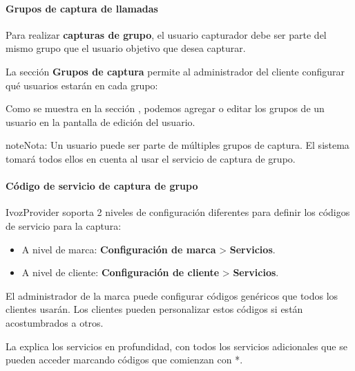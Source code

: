 \documentclass[letterpaper,10pt,spanish]{sphinxmanual}
\begin{document}
\paragraph{Grupos de captura de llamadas}
\label{administration_portal/client/vpbx/user_configuration/pick_up_groups:call-pickup-groups}
Para realizar \textbf{capturas de grupo}, el usuario capturador debe ser parte del mismo grupo que el usuario objetivo que desea capturar.

La sección \textbf{Grupos de captura} permite al administrador del cliente configurar qué usuarios estarán en cada grupo:

Como se muestra en la sección {\hyperref[administration_portal/client/vpbx/users:users]{}}, podemos agregar o editar los grupos de un usuario en la pantalla de edición del usuario.

\begin{notice}{note}{Nota:}
Un usuario puede ser parte de múltiples grupos de captura. El sistema tomará todos ellos en cuenta al usar el servicio de captura de grupo.
\end{notice}


\paragraph{Código de servicio de captura de grupo}
\label{administration_portal/client/vpbx/user_configuration/pick_up_groups:group-pickup-service-code}
IvozProvider soporta 2 niveles de configuración diferentes para definir los códigos de servicio para la captura:
\begin{itemize}
\item {} 
A nivel de marca: \textbf{Configuración de marca} \textgreater{} \textbf{Servicios}.

\item {} 
A nivel de cliente: \textbf{Configuración de cliente} \textgreater{} \textbf{Servicios}.

\end{itemize}

El administrador de la marca puede configurar códigos genéricos que todos los clientes usarán. Los clientes pueden personalizar estos códigos si están acostumbrados a otros.

La {\hyperref[administration_portal/client/vpbx/services:services]{}} explica los servicios en profundidad, con todos los servicios adicionales que se pueden acceder marcando códigos que comienzan con *.
\end{document}
